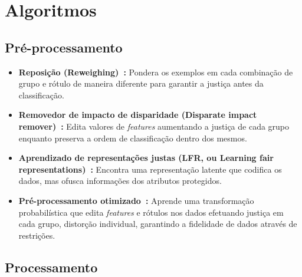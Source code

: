 \documentclass[portugues, 12pt, a4paper]{article}
\begin{document}
\section{Algoritmos}

\subsection{Pré-processamento}

\begin{itemize}
\item \textbf{Reposição (Reweighing)~\citep{Kamiran_2011}:} Pondera os exemplos em cada combinação de grupo e rótulo de maneira diferente para garantir a justiça antes da classificação.

\item \textbf{Removedor de impacto de disparidade (Disparate impact remover)~\citep{Feldman_2015}:} Edita valores de \textit{features} aumentando a justiça de cada grupo enquanto preserva a ordem de classificação dentro dos mesmos.

\item \textbf{Aprendizado de representações justas (LFR, ou Learning fair representations)~\citep{Zemel_2013}:} Encontra uma representação latente que codifica os dados, mas ofusca informações dos atributos protegidos.

\item \textbf{Pré-processamento otimizado~\citep{Calmon_2017}:} Aprende uma transformação probabilística que edita \textit{features} e rótulos nos dados efetuando justiça em cada grupo, distorção individual, garantindo a fidelidade de dados através de restrições.

\end{itemize}

\subsection{Processamento}
\end{document}
